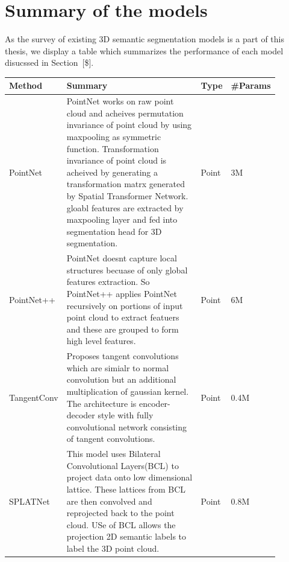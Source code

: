     \section{Summary of the models}
    As the survey of existing 3D semantic segmentation models is a part of this thesis, we display a table which summarizes the performance of each model disucssed in Section~[\$].
    \begin{longtable}{|p{0.15\linewidth} | p{0.59\linewidth}| p{0.06\linewidth} |p{0.09\linewidth}|}
            \hline
            \textbf{Method} & \textbf{Summary} & \textbf{Type} & \textbf{\#Params} \\
            \hline 
            PointNet\cite{Qi_2017_CVPR_pointnet} &
            PointNet works on raw point cloud and acheives permutation invariance of point cloud by using maxpooling as symmetric function.
            Transformation invariance of point cloud is acheived by generating a transformation matrx generated by Spatial Transformer Network.
            gloabl features are extracted by maxpooling layer and fed into segmentation head for 3D segmentation.
            & Point & 3M \\
            \hline
            PointNet++\cite{qi2017pointnet++} &
            PointNet doesnt capture local structures becuase of only global features extraction.
            So PointNet++ applies PointNet recursively on portions of input point cloud to extract featuers and these are grouped to form high level features.
            & Point & 6M \\
            \hline
            TangentConv\cite{Tatarchenko_2018_CVPR_tangconv} &
            Proposes tangent convolutions which are simialr to normal convolution but an additional multiplication of gaussian kernel.
            The architecture is encoder-decoder style with fully convolutional network consisting of tangent convolutions.
            & Point & 0.4M\\
            \hline
            SPLATNet\cite{Su_2018_CVPR_splatnet} &
            This model uses Bilateral Convolutional Layers(BCL) to project data onto low dimensional lattice.
            These lattices from BCL are then convolved and reprojected back to the point cloud.
            USe of BCL allows the projection 2D semantic labels to label the 3D point cloud.
            & Point & 0.8M \\

\end{longtable}
